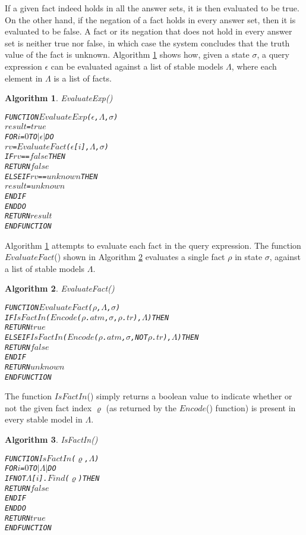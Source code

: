 \documentclass[11pt]{report}
\newenvironment{vverbatim}
{
  \begin{alltt}
}
{
    \vspace{-\baselineskip}
  \end{alltt}
}
\newtheorem{vvalgorithm}{Algorithm}[chapter]
\newenvironment{valgorithm}[2]
{
  \begin{vvalgorithm}{#1}
    \label{#2}
    \small
    \begin{vverbatim}
}
{
    \end{vverbatim}
  \end{vvalgorithm}
}
\begin{document}
        If a given fact indeed holds in all the answer sets, it is then
        evaluated to be true. On the other hand, if the negation of a fact
        holds in every answer set, then it is evaluated to be false. A fact
        or its negation that does not hold in every answer set is neither true
        nor false, in which case the system concludes that the truth value of
        the fact is unknown. Algorithm \ref{algo-polup-evale} shows how, given
        a state $\sigma$, a query expression $\epsilon$ can be evaluated
        against a list of stable models $\Lambda$, where each element in
        $\Lambda$ is a list of facts.

        \begin{valgorithm}{EvaluateExp()}{algo-polup-evale}
FUNCTION \(EvaluateExp\)(\(\epsilon\), \(\Lambda\), \(\sigma\))
  \(result\) = \(true\)
  FOR \(i\) = \(0\) TO \(|\epsilon|\) DO
    \(rv\) = \(EvaluateFact\)(\(\epsilon\)[\(i\)], \(\Lambda\), \(\sigma\))
    IF \(rv\) == \(false\) THEN
      RETURN \(false\)
    ELSE IF \(rv\) == \(unknown\) THEN
      \(result\) = \(unknown\)
    ENDIF
  ENDDO
  RETURN \(result\)
ENDFUNCTION
        \end{valgorithm}

        Algorithm \ref{algo-polup-evale} attempts to evaluate each fact in the
        query expression. The function $EvaluateFact$() shown in Algorithm
        \ref{algo-polup-evalf} evaluates a single fact $\rho$ in state
        $\sigma$, against a list of stable models $\Lambda$.

        \begin{valgorithm}{EvaluateFact()}{algo-polup-evalf}
FUNCTION \(EvaluateFact\)(\(\rho\), \(\Lambda\), \(\sigma\))
  IF \(IsFactIn\)(\(Encode\)(\(\rho\).\(atm\), \(\sigma\), \(\rho\).\(tr\)), \(\Lambda\)) THEN
    RETURN \(true\)
  ELSE IF \(IsFactIn\)(\(Encode\)(\(\rho\).\(atm\), \(\sigma\), NOT \(\rho\).\(tr\)), \(\Lambda\)) THEN
    RETURN \(false\)
  ENDIF
  RETURN \(unknown\)
ENDFUNCTION
        \end{valgorithm}

        The function $IsFactIn$() simply returns a boolean value to
        indicate whether or not the given fact index $\varrho$ (as returned
        by the $Encode$() function) is present in every stable model in
        $\Lambda$.

        \begin{valgorithm}{IsFactIn()}{algo-polup-isinf}
FUNCTION \(IsFactIn\)(\(\varrho\), \(\Lambda\))
  FOR \(i\) = \(0\) TO \(|\Lambda|\) DO
    IF NOT \(\Lambda\)[\(i\)].\(Find\)(\(\varrho\)) THEN
      RETURN \(false\)
    ENDIF
  ENDDO
  RETURN \(true\)
ENDFUNCTION
        \end{valgorithm}
\end{document}

